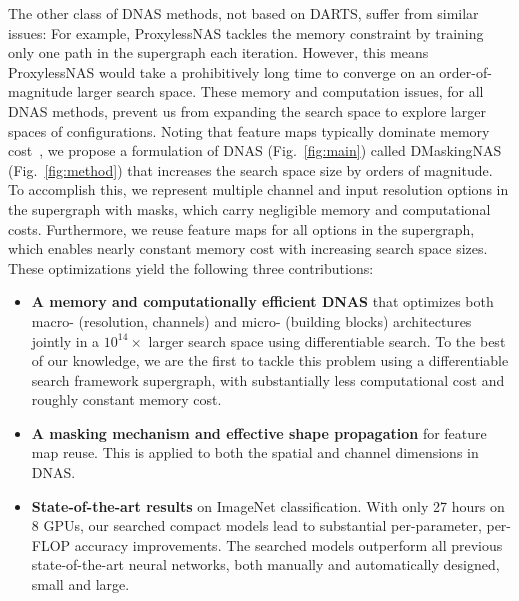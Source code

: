 \documentclass[10pt,twocolumn,letterpaper]{article}
\begin{document}
The other class of DNAS methods, not based on DARTS, suffer from similar issues: For example, ProxylessNAS tackles the memory constraint by training only one path in the supergraph each iteration. However, this means ProxylessNAS would take a prohibitively long time to converge on an order-of-magnitude larger search space. These memory and computation issues, for all DNAS methods, prevent us from expanding the search space to explore larger spaces of configurations. Noting that feature maps typically dominate memory cost~\cite{nvda_guide}, we propose a formulation of DNAS (Fig.~\ref{fig:main}) called DMaskingNAS (Fig.~\ref{fig:method}) that increases the search space size by orders of magnitude. To accomplish this, we represent multiple channel and input resolution options in the supergraph with masks, which carry negligible memory and computational costs. Furthermore, we reuse feature maps for all options in the supergraph, which enables nearly constant memory cost with increasing search space sizes. These optimizations yield the following three contributions:

\begin{itemize}
    \item \textbf{A memory and computationally efficient DNAS} that optimizes both macro- (resolution, channels) and micro- (building blocks) architectures jointly in a $10^{14}\times$ larger search space using differentiable search. To the best of our knowledge, we are the first to tackle this problem using a differentiable search framework supergraph, with substantially less computational cost and roughly constant memory cost.
    \item \textbf{A masking mechanism and effective shape propagation} for feature map reuse. This is applied to both the spatial and channel dimensions in DNAS.
    \item \textbf{State-of-the-art results} on ImageNet classification. With only 27 hours on 8 GPUs, our searched compact models lead to substantial per-parameter, per-FLOP accuracy improvements. The searched models outperform all previous state-of-the-art neural networks, both manually and automatically designed, small and large.
\end{itemize}
\end{document}
